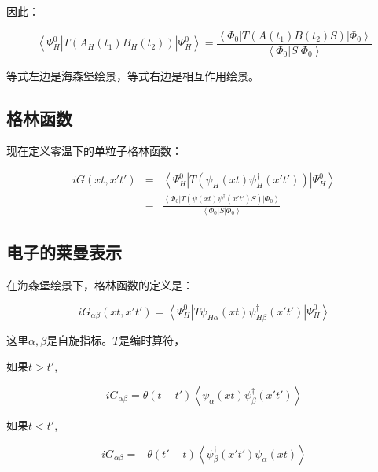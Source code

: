 因此：

\begin{equation}
\left\langle \Psi_H^0 \right| T \left( A_H(t_1)B_H(t_2)  \right) \left| \Psi_H^0 \right\rangle = \frac{ \left\langle \Phi_0 \right|  T \left( A(t_1)  B(t_2) S  \right) \left| \Phi_0 \right\rangle }{ \left\langle \Phi_0 \right| S \left| \Phi_0 \right\rangle }
\end{equation}

等式左边是海森堡绘景，等式右边是相互作用绘景。

\subsection{格林函数}

现在定义零温下的单粒子格林函数：

\begin{eqnarray*}
iG(xt,x't') & = & \left\langle \Psi_H^0 \right| T (\psi_H(xt) \psi_H^\dagger (x't')) \left| \Psi_H^0 \right\rangle  \\
{} & = & \frac{ \left\langle \Phi_0 \right|  T \left( \psi(xt)  \psi^\dagger(x't') S  \right) \left| \Phi_0 \right\rangle }{ \left\langle \Phi_0 \right| S \left| \Phi_0 \right\rangle }
\end{eqnarray*}

\subsection{电子的莱曼表示}

在海森堡绘景下，格林函数的定义是：

\begin{equation}
iG_{\alpha \beta} (xt,x't') = \left\langle \Psi_H^0 \right| T \psi_{H \alpha} (xt) \psi_{H \beta}^\dagger (x't') \left| \Psi_H^0 \right\rangle
\end{equation}

这里$\alpha, \beta$是自旋指标。$T$是编时算符，

如果$t>t'$, 

\begin{equation*}
iG_{\alpha \beta} = \theta(t - t') \left\langle \psi_\alpha(xt) \psi_\beta^\dagger(x't')   \right\rangle
\end{equation*}

如果$t < t'$, 

\begin{equation*}
iG_{\alpha \beta} = - \theta(t' - t) \left\langle  \psi_\beta^\dagger(x't')    \psi_\alpha(xt)   \right\rangle
\end{equation*}

